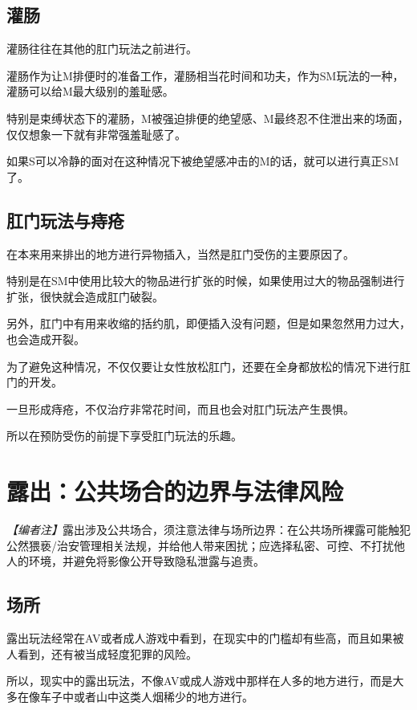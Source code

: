 \documentclass[12pt,UTF8]{ctexbook}
\begin{document}
\subsection{灌肠}

灌肠往往在其他的肛门玩法之前进行。

灌肠作为让M排便时的准备工作，灌肠相当花时间和功夫，作为SM玩法的一种，灌肠可以给M最大级别的羞耻感。

特别是束缚状态下的灌肠，M被强迫排便的绝望感、M最终忍不住泄出来的场面，仅仅想象一下就有非常强羞耻感了。

如果S可以冷静的面对在这种情况下被绝望感冲击的M的话，就可以进行真正SM了。

\subsection{肛门玩法与痔疮}

在本来用来排出的地方进行异物插入，当然是肛门受伤的主要原因了。

特别是在SM中使用比较大的物品进行扩张的时候，如果使用过大的物品强制进行扩张，很快就会造成肛门破裂。

另外，肛门中有用来收缩的括约肌，即便插入没有问题，但是如果忽然用力过大，也会造成开裂。

为了避免这种情况，不仅仅要让女性放松肛门，还要在全身都放松的情况下进行肛门的开发。

一旦形成痔疮，不仅治疗非常花时间，而且也会对肛门玩法产生畏惧。

所以在预防受伤的前提下享受肛门玩法的乐趣。 

\section{露出：公共场合的边界与法律风险}

\noindent\textit{【编者注】}露出涉及公共场合，须注意法律与场所边界：在公共场所裸露可能触犯公然猥亵/治安管理相关法规，并给他人带来困扰；应选择私密、可控、不打扰他人的环境，并避免将影像公开导致隐私泄露与追责。

\subsection{场所}

露出玩法经常在AV或者成人游戏中看到，在现实中的门槛却有些高，而且如果被人看到，还有被当成轻度犯罪的风险。

所以，现实中的露出玩法，不像AV或成人游戏中那样在人多的地方进行，而是大多在像车子中或者山中这类人烟稀少的地方进行。
\end{document}
